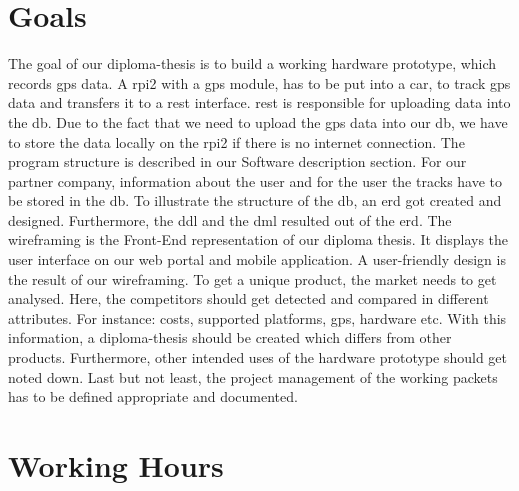 \section*{Goals}
The goal of our diploma-thesis is to build a working hardware prototype, which records \gls{gps} data. A \gls{rpi2} with a \gls{gps} module, has to be put into a car, to track \gls{gps} data and transfers it to a \gls{rest} interface. \gls{rest} is responsible for uploading data into the \gls{db}. Due to the fact that we need to upload the \gls{gps} data into our \gls{db}, we have to store the data locally on the \gls{rpi2} if there is no internet connection. The program structure is described in our Software description section.
\newline \newline
For our partner company, information about the user and for the user the tracks have to be stored in the \gls{db}. To illustrate the structure of the \gls{db}, an \gls{erd} got created and designed. Furthermore, the \gls{ddl} and the \gls{dml} resulted out of the \gls{erd}.
\newline \newline
The wireframing is the Front-End representation of our diploma thesis. It displays the user interface on our web portal and mobile application. A user-friendly design is the result of our wireframing.
\newline \newline
To get a unique product, the market needs to get analysed. Here, the competitors should get detected and compared in different attributes. For instance: costs, supported platforms, \gls{gps}, hardware etc. With this information, a diploma-thesis should be created which differs from other products. Furthermore, other intended uses of the hardware prototype should get noted down.
\newline \newline
Last but not least, the project management of the working packets has to be defined appropriate and documented.
\section*{Working Hours}
